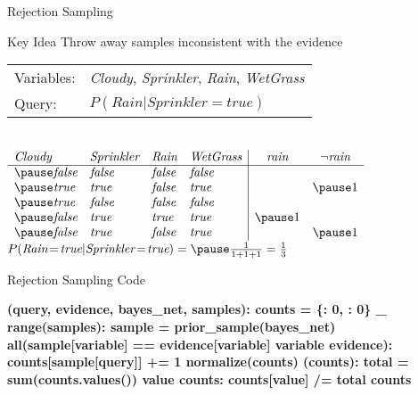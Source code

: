 \documentclass[14pt]{beamer}
\begin{document}
\begin{frame}[fragile]{Rejection Sampling}
	\begin{block}{Key Idea}
		Throw away samples inconsistent with the evidence
	\end{block}
	\medskip
	\pause
	\begin{tabular}{ll}
		Variables: & \textit{Cloudy}, \textit{Sprinkler}, \textit{Rain}, \textit{WetGrass} \\
		Query:     & $P(\textit{Rain}|\textit{Sprinkler}\!=\!\textit{true})$
	\end{tabular}
	\\
	\medskip
	$
	\begin{array}{llll|cc}
		\textit{Cloudy} & \textit{Sprinkler} & \textit{Rain}  & \textit{WetGrass} & \textit{rain} & \lnot\textit{rain} \\
		\hline
		\pause
		\textit{false}  & \textit{false}     & \textit{false} & \textit{false}    &           &            \\
		\pause
		\textit{true}   & \textit{true}      & \textit{false} & \textit{true}     &           & \pause 1   \\
		\pause
		\textit{true}   & \textit{false}     & \textit{false} & \textit{false}    &           &            \\
		\pause
		\textit{false}  & \textit{true}      & \textit{true}  & \textit{true}     & \pause 1  &            \\
		\pause
		\textit{false}  & \textit{true}      & \textit{false} & \textit{true}     &           & \pause 1
	\end{array}
	$
	\\
	\medskip
	\pause
	\tab$P(\textit{Rain}\!=\!\textit{true}|\textit{Sprinkler}\!=\!\textit{true})=\pause\frac{1}{1 + 1 + 1}=\frac{1}{3}$
\end{frame}

\begin{frame}[fragile]{Rejection Sampling Code}
\begin{semiverbatim}\scriptsize\bfseries
{} (query, evidence, bayes_net, samples):
    \pause{}
    counts = \{: \num{0}, : \num{0}\}
     _  range(samples):
        sample = prior_sample(bayes_net)
        \pause{}
         all(sample[variable] == evidence[variable]  variable  evidence):
            counts[sample[query]] += \num{1}
    \pause{}
     normalize(counts)
\pause
{} (counts):
    \pause{}
    total = sum(counts.values())
     value  counts:
        counts[value] /= total
     counts
\end{semiverbatim}
\end{frame}
\end{document}
